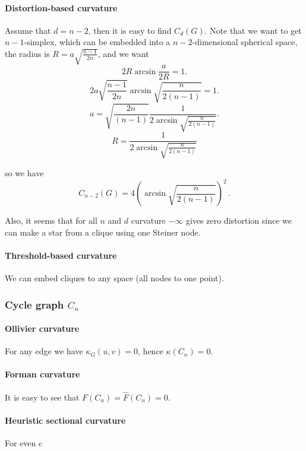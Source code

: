 \documentclass{article} %
\begin{document}
\paragraph{Distortion-based curvature}

Assume that $d = n-2$, then it is easy to find $C_d(G)$. Note that we want to get $n-1$-simplex, which can be embedded into a $n-2$-dimensional spherical space, the radius is $R = a\sqrt{\frac{n-1}{2n}}$, and we want
\[
2 R \arcsin \frac{a}{2R} = 1.
\]
\[
2 a\sqrt{\frac{n-1}{2n}} \arcsin \sqrt{\frac{n}{2(n-1)}} = 1.
\]
\[
a  = \sqrt{\frac{2n}{(n-1)}}\frac{1}{2\arcsin \sqrt{\frac{n}{2(n-1)}}}.
\]
\[
R = \frac{1}{2\arcsin \sqrt{\frac{n}{2(n-1)}}}
\]

so we have
\[
C_{n-2}(G) = 4 \left(\arcsin \sqrt{\frac{n}{2(n-1)}}\right)^2\,.
\]

Also, it seems that for all $n$ and $d$ curvature $-\infty$ gives zero distortion since we can make a star from a clique using one Steiner node.

\paragraph{Threshold-based curvature} We can embed cliques to any space (all nodes to one point).


\subsubsection{Cycle graph $C_n$} 

\paragraph{Ollivier curvature}  
For any edge we have $\kappa_G(u,v) = 0$, hence $\kappa(C_n) = 0$.

\paragraph{Forman curvature} 

It is easy to see that $F(C_n) = \hat F(C_n) = 0$.


\paragraph{Heuristic sectional curvature} For even c
\end{document}
